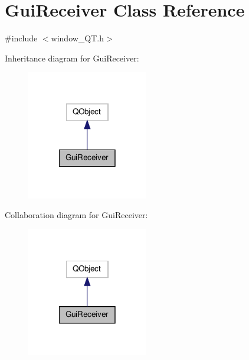 \hypertarget{classGuiReceiver}{\section{Gui\-Receiver Class Reference}
\label{classGuiReceiver}
}


{\ttfamily \#include $<$window\-\_\-\-Q\-T.\-h$>$}



Inheritance diagram for Gui\-Receiver\-:
\nopagebreak
\begin{figure}[H]
\begin{center}
\leavevmode
\includegraphics[width=150pt]{classGuiReceiver__inherit__graph}
\end{center}
\end{figure}


Collaboration diagram for Gui\-Receiver\-:
\nopagebreak
\begin{figure}[H]
\begin{center}
\leavevmode
\includegraphics[width=150pt]{classGuiReceiver__coll__graph}
\end{center}
\end{figure}
